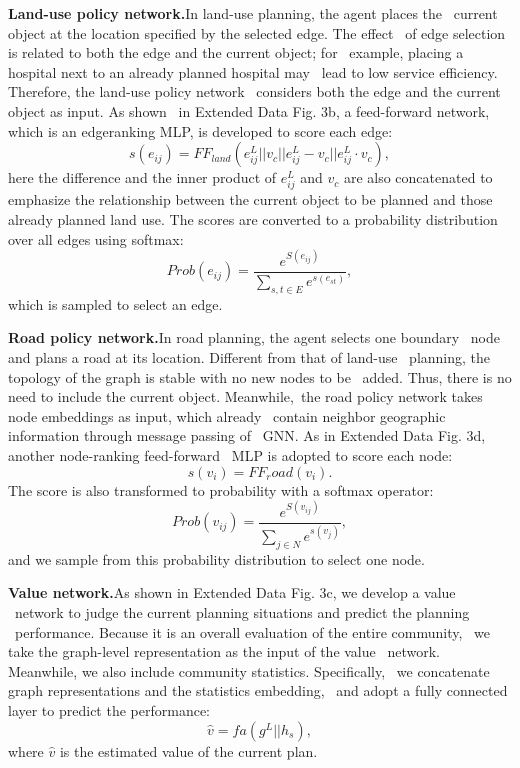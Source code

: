 \textbf{Land-use policy network.}In land-use planning, the agent places the \
current object at the location specified by the selected edge. The effect \
of edge selection is related to both the edge and the current object; for \
example, placing a hospital next to an already planned hospital may \
lead to low service efficiency. Therefore, the land-use policy network \
considers both the edge and the current object as input. As shown \
in Extended Data Fig. 3b, a feed-forward network, which is an edgeranking MLP, is developed to score each edge:
\begin{equation}
    s(e_{ij})=FF_{land}(e_{ij}^L||v_c||e_{ij}^L-v_c||e_{ij}^L·v_c),\label{each-edge-score}
\end{equation}
here the difference and the inner product of $e^L_{ij}$ and $v_c$ are also concatenated to emphasize the relationship between the current object to 
be planned and those already planned land use. The scores are converted to a probability distribution over all edges using softmax:
\begin{equation}
    Prob(e_{ij})=\frac{e^{S(e_{ij})}}{\sum_{s,t\in E}e^{s(e_{st})}},\label{scores-converted-to-probability-distribution}
\end{equation}
which is sampled to select an edge.

\textbf{Road policy network.}In road planning, the agent selects one boundary \
node and plans a road at its location. Different from that of land-use \
planning, the topology of the graph is stable with no new nodes to be \
added. Thus, there is no need to include the current object. Meanwhile,\
the road policy network takes node embeddings as input, which already \
contain neighbor geographic information through message passing of \
GNN. As in Extended Data Fig. 3d, another node-ranking feed-forward \
MLP is adopted to score each node:
\begin{equation}
    s(v_i) = FF_road(v_i).\label{score-based-in-node-ranking-feed-forward-MLP}
\end{equation}
The score is also transformed to probability with a softmax operator:
\begin{equation}
    Prob(v_{ij})=\frac{e^{S(v_{ij})}}{\sum_{j\in N}e^{s(v_{j})}},\label{score-transformed-to-probability}
\end{equation}
and we sample from this probability distribution to select one node.

\textbf{Value network.}As shown in Extended Data Fig. 3c, we develop a value \
network to judge the current planning situations and predict the planning \
performance. Because it is an overall evaluation of the entire community, \
we take the graph-level representation as the input of the value \
network. Meanwhile, we also include community statistics. Specifically, \
we concatenate graph representations and the statistics embedding, \
and adopt a fully connected layer to predict the performance:
\begin{equation}
    \hat{v} = fa(g^L||h_s),\label{predict-performance}
\end{equation}
where $\hat{v}$ is the estimated value of the current plan.

